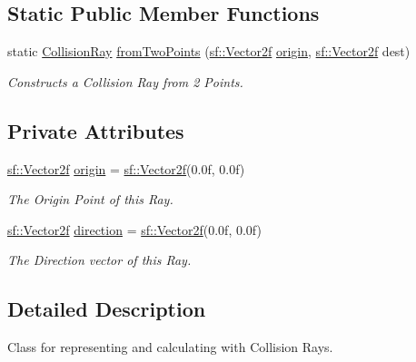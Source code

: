 \subsection*{Static Public Member Functions}
\begin{DoxyCompactItemize}
\item 
static \mbox{\hyperlink{class_collision_ray}{Collision\+Ray}} \mbox{\hyperlink{class_collision_ray_a7de1834387c709bf830ad104337cf955}{from\+Two\+Points}} (\mbox{\hyperlink{classsf_1_1_vector2}{sf\+::\+Vector2f}} \mbox{\hyperlink{class_collision_ray_a276b29e9423edf7a637c40dc8b51c068}{origin}}, \mbox{\hyperlink{classsf_1_1_vector2}{sf\+::\+Vector2f}} dest)
\begin{DoxyCompactList}\small\item\em Constructs a Collision Ray from 2 Points. \end{DoxyCompactList}\end{DoxyCompactItemize}
\subsection*{Private Attributes}
\begin{DoxyCompactItemize}
\item 
\mbox{\label{class_collision_ray_a276b29e9423edf7a637c40dc8b51c068}} 
\mbox{\hyperlink{classsf_1_1_vector2}{sf\+::\+Vector2f}} \mbox{\hyperlink{class_collision_ray_a276b29e9423edf7a637c40dc8b51c068}{origin}} = \mbox{\hyperlink{classsf_1_1_vector2}{sf\+::\+Vector2f}}(0.\+0f, 0.\+0f)
\begin{DoxyCompactList}\small\item\em The Origin Point of this Ray. \end{DoxyCompactList}\item 
\mbox{\label{class_collision_ray_a81497ff5abbca7a84761cd4bf912af0b}} 
\mbox{\hyperlink{classsf_1_1_vector2}{sf\+::\+Vector2f}} \mbox{\hyperlink{class_collision_ray_a81497ff5abbca7a84761cd4bf912af0b}{direction}} = \mbox{\hyperlink{classsf_1_1_vector2}{sf\+::\+Vector2f}}(0.\+0f, 0.\+0f)
\begin{DoxyCompactList}\small\item\em The Direction vector of this Ray. \end{DoxyCompactList}\end{DoxyCompactItemize}


\subsection{Detailed Description}
Class for representing and calculating with Collision Rays. 

